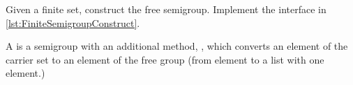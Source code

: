 \label{sec:free-semigroup}


\begin{codeexercise}
    \label{ex:TestFiniteSemigroupConstruct}
    Given a finite set, construct the free semigroup.
    Implement the interface in \cref{lst:FiniteSemigroupConstruct}.
\end{codeexercise}


A \FreeSemigroup is a semigroup with an additional method, , which converts an element of the carrier set to an element of the free group (\eg from element to a list with one element.)

